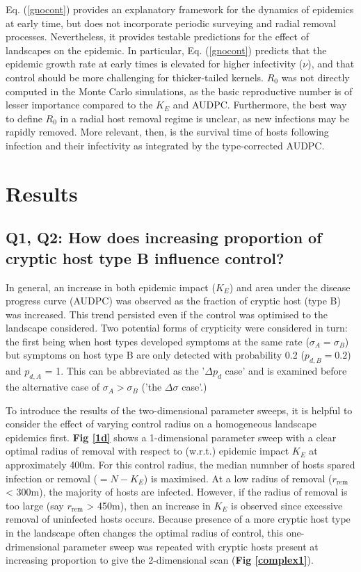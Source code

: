 \documentclass[11pt,letterpaper]{article}
\begin{document}
Eq. (\ref{gnocont}) provides an explanatory framework for the dynamics of epidemics at early time, but does not incorporate periodic surveying and radial removal processes.  Nevertheless, it provides testable predictions for the effect of landscapes on the epidemic. In particular, Eq. (\ref{gnocont}) predicts that the epidemic growth rate at early times is elevated for higher infectivity ($\nu$), and that control should be more challenging for thicker-tailed kernels. $R_0$ was not directly computed in the Monte Carlo simulations, as the basic reproductive number is of lesser importance compared to the $K_E$ and AUDPC. Furthermore, the best way to define $R_0$ in a radial host removal regime is unclear, as new infections may be rapidly removed. More relevant, then, is the survival time of hosts following infection and their infectivity as integrated by the type-corrected AUDPC.

\FloatBarrier
\section*{Results}

\subsection*{Q1, Q2: How does increasing proportion of cryptic host type B influence control?}

In general, an increase in both epidemic impact ($K_E$) and area under the disease progress curve (AUDPC) was observed as the fraction of cryptic host (type B) was increased. This trend persisted even if the control was optimised to the landscape considered. Two potential forms of crypticity were considered in turn: the first being when host types developed symptoms at the same rate ($\sigma_A = \sigma_B$) but symptoms on host type B are only detected with probability 0.2 ($p_{d,B} = 0.2$) and $p_{d,A}$ = 1. This can be abbreviated as the '$\Delta p_d$ case' and is examined before the alternative case of $\sigma_A > \sigma_B$ ('the $\Delta \sigma$ case'.)

To introduce the results of the two-dimensional parameter sweeps, it is helpful to consider the effect of varying control radius on a homogeneous landscape epidemics first. \textbf{Fig \ref{1d}} shows a 1-dimensional parameter sweep with a clear optimal radius of removal with respect to (w.r.t.) epidemic impact $K_E$ at approximately 400m. For this control radius, the median numnber of hosts spared infection or removal ($= N - K_E$) is maximised. At a low radius of removal ($r_\mathrm{rem}$ < 300m), the majority of hosts are infected. However, if  the radius of removal is too large (say $r_\mathrm{rem}$ > 450m), then an increase in $K_E$ is observed since excessive removal of uninfected hosts occurs. Because presence of a more cryptic host type in the landscape often changes the optimal radius of control, this one-drimensional parameter sweep was repeated with cryptic hosts present at increasing proportion to give the 2-dimensional scan (\textbf{Fig \ref{complex1}}). 
\end{document}

